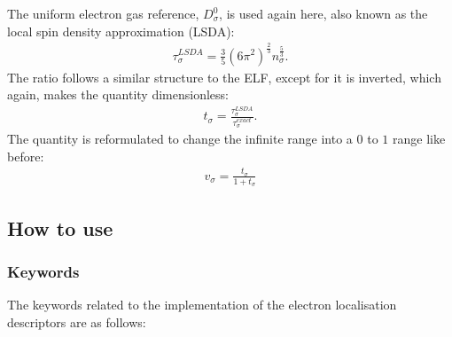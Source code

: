 \documentclass[letterpaper,10pt,english]{sphinxmanual}
\begin{document}
The uniform electron gas reference, \(D_{\sigma}^{0}\), is used
again here, also known as the local spin density approximation (LSDA):
\begin{equation*}
\begin{split}\tau_{\sigma}^{LSDA} = \frac{3}{5} \left( 6\pi^{2} \right) ^{\frac{2}{3}} n_{\sigma}^{\frac{5}{3}}.\end{split}
\end{equation*}
The ratio follows a similar structure to the ELF, except for it is
inverted, which again, makes the quantity dimensionless:
\begin{equation*}
\begin{split}t_{\sigma} = \frac {\tau_{\sigma}^{LSDA}} {\tau_{\sigma}^{exact}}.\end{split}
\end{equation*}
The quantity is reformulated to change the infinite range into a
\(0\) to \(1\) range like before:
\begin{equation*}
\begin{split}v_{\sigma} = \frac{t_{\sigma}} {1 + t_{\sigma}}\end{split}
\end{equation*}

\subsection{How to use}
\label{\detokenize{eld:how-to-use}}

\subsubsection{Keywords}
\label{\detokenize{eld:keywords}}
The keywords related to the implementation of the electron localisation
descriptors are as follows:
\end{document}
